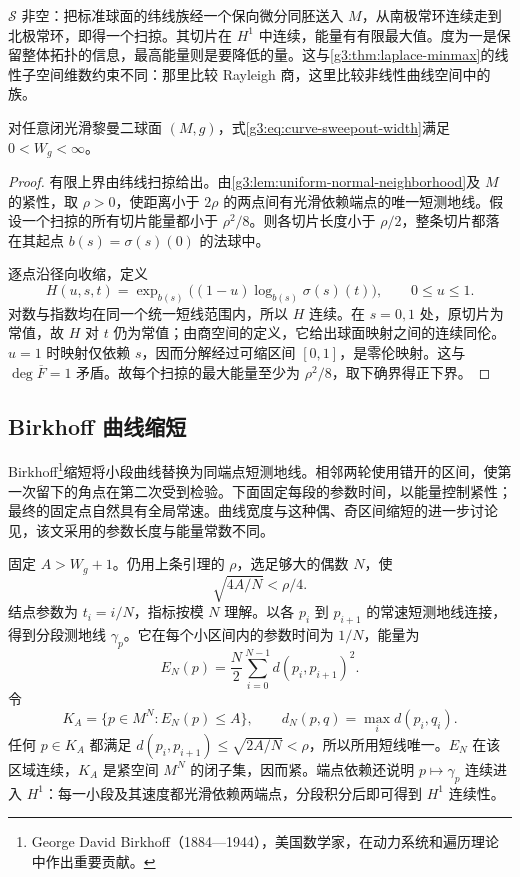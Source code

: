 \ProseParagraphBreak
\(\mathscr S\) 非空：把标准球面的纬线族经一个保向微分同胚送入 \(M\)，从南极常环连续走到北极常环，即得一个扫掠。其切片在 \(H^1\) 中连续，能量有有限最大值。度为一是保留整体拓扑的信息，最高能量则是要降低的量。这与\cref{g3:thm:laplace-minmax}的线性子空间维数约束不同：那里比较 Rayleigh 商，这里比较非线性曲线空间中的族。

\begin{lemma}\label{g3:lem:curve-width-positive}
	对任意闭光滑黎曼二球面 \((M,g)\)，式\eqref{g3:eq:curve-sweepout-width}满足 \(0<W_g<\infty\)。
\end{lemma}
\begin{proof}
	有限上界由纬线扫掠给出。由\cref{g3:lem:uniform-normal-neighborhood}及 \(M\) 的紧性，取 \(\rho>0\)，使距离小于 \(2\rho\) 的两点间有光滑依赖端点的唯一短测地线。假设一个扫掠的所有切片能量都小于 \(\rho^2/8\)。则各切片长度小于 \(\rho/2\)，整条切片都落在其起点 \(b(s)=\sigma(s)(0)\) 的法球中。

	逐点沿径向收缩，定义
	\[
		H(u,s,t)=\exp_{b(s)}\bigl((1-u)\log_{b(s)}\sigma(s)(t)\bigr),
		\qquad 0\le u\le1.
	\]
	对数与指数均在同一个统一短线范围内，所以 \(H\) 连续。在 \(s=0,1\) 处，原切片为常值，故 \(H\) 对 \(t\) 仍为常值；由商空间的定义，它给出球面映射之间的连续同伦。\(u=1\) 时映射仅依赖 \(s\)，因而分解经过可缩区间 \([0,1]\)，是零伦映射。这与 \(\deg\overline F=1\) 矛盾。故每个扫掠的最大能量至少为 \(\rho^2/8\)，取下确界得正下界。
\end{proof}

\subsection{Birkhoff 曲线缩短}
\label{g3:subsec:2305:02}
Birkhoff\footnote{George David Birkhoff（1884—1944），美国数学家，在动力系统和遍历理论中作出重要贡献。}缩短将小段曲线替换为同端点短测地线。相邻两轮使用错开的区间，使第一次留下的角点在第二次受到检验。下面固定每段的参数时间，以能量控制紧性；最终的固定点自然具有全局常速。曲线宽度与这种偶、奇区间缩短的进一步讨论见\cite[第1节，第2519--2523页]{ColdingMinicozzi2008Width}，该文采用的参数长度与能量常数不同。

\ProseParagraphBreak
固定 \(A>W_g+1\)。仍用上条引理的 \(\rho\)，选足够大的偶数 \(N\)，使
\begin{equation}\label{g3:eq:birkhoff-mesh-choice}
	\sqrt{4A/N}<\rho/4.
\end{equation}
结点参数为 \(t_i=i/N\)，指标按模 \(N\) 理解。以各 \(p_i\) 到 \(p_{i+1}\) 的常速短测地线连接，得到分段测地线 \(\gamma_p\)。它在每个小区间内的参数时间为 \(1/N\)，能量为
\[
	E_N(p)=\frac N2\sum_{i=0}^{N-1}d(p_i,p_{i+1})^2.
\]
令
\[
	K_A=\{p\in M^N:E_N(p)\le A\},\qquad
	d_N(p,q)=\max_i d(p_i,q_i).
\]
任何 \(p\in K_A\) 都满足 \(d(p_i,p_{i+1})\le\sqrt{2A/N}<\rho\)，所以所用短线唯一。\(E_N\) 在该区域连续，\(K_A\) 是紧空间 \(M^N\) 的闭子集，因而紧。端点依赖还说明 \(p\mapsto\gamma_p\) 连续进入 \(H^1\)：每一小段及其速度都光滑依赖两端点，分段积分后即可得到 \(H^1\) 连续性。

